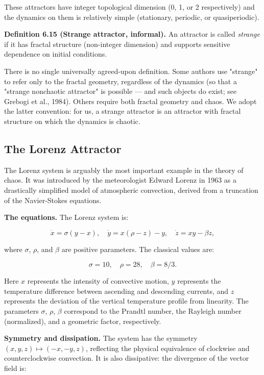 These attractors have integer topological dimension (0, 1, or 2 respectively) and the dynamics on them is relatively simple (stationary, periodic, or quasiperiodic).

\textbf{Definition 6.15 (Strange attractor, informal).} An attractor is called \textit{strange} if it has fractal structure (non-integer dimension) and supports sensitive dependence on initial conditions.

\begin{remark}
There is no single universally agreed-upon definition. Some authors use "strange" to refer only to the fractal geometry, regardless of the dynamics (so that a "strange nonchaotic attractor" is possible --- and such objects do exist; see Grebogi et al., 1984). Others require both fractal geometry and chaos. We adopt the latter convention: for us, a strange attractor is an attractor with fractal structure on which the dynamics is chaotic.
\end{remark}


\subsection{The Lorenz Attractor}\label{sec:6.4.3}

The Lorenz system is arguably the most important example in the theory of chaos. It was introduced by the meteorologist Edward Lorenz in 1963 as a drastically simplified model of atmospheric convection, derived from a truncation of the Navier-Stokes equations.

\textbf{The equations.} The Lorenz system is:

\[
\dot{x} = \sigma(y - x), \quad \dot{y} = x(\rho - z) - y, \quad \dot{z} = xy - \beta z,
\]

where $\sigma$, $\rho$, and $\beta$ are positive parameters. The classical values are:

\[
\sigma = 10, \quad \rho = 28, \quad \beta = 8/3.
\]

Here $x$ represents the intensity of convective motion, $y$ represents the temperature difference between ascending and descending currents, and $z$ represents the deviation of the vertical temperature profile from linearity. The parameters $\sigma$, $\rho$, $\beta$ correspond to the Prandtl number, the Rayleigh number (normalized), and a geometric factor, respectively.

\textbf{Symmetry and dissipation.} The system has the symmetry $(x, y, z) \mapsto (-x, -y, z)$, reflecting the physical equivalence of clockwise and counterclockwise convection. It is also dissipative: the divergence of the vector field is:

